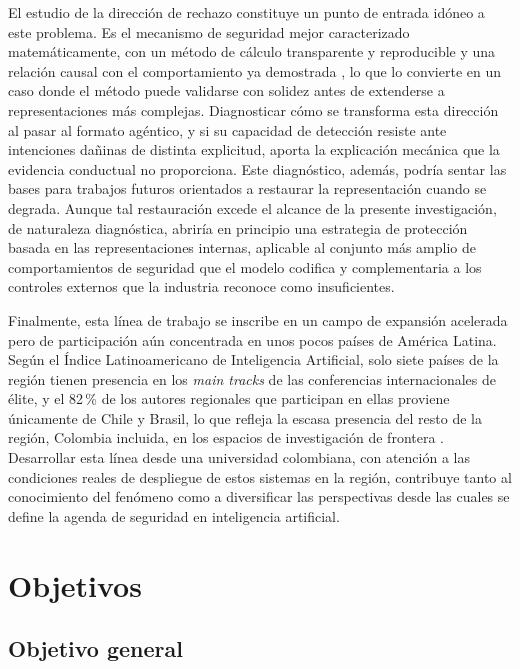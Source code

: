 \documentclass[12pt,a4paper]{article}
\newcommand{\parencite}[1]{\citep{#1}}
\begin{document}
El estudio de la dirección de rechazo constituye un punto de entrada idóneo a este problema. Es el mecanismo de seguridad mejor caracterizado matemáticamente, con un método de cálculo transparente y reproducible y una relación causal con el comportamiento ya demostrada \parencite{arditi2024}, lo que lo convierte en un caso donde el método puede validarse con solidez antes de extenderse a representaciones más complejas. Diagnosticar cómo se transforma esta dirección al pasar al formato agéntico, y si su capacidad de detección resiste ante intenciones dañinas de distinta explicitud, aporta la explicación mecánica que la evidencia conductual no proporciona. Este diagnóstico, además, podría sentar las bases para trabajos futuros orientados a restaurar la representación cuando se degrada. Aunque tal restauración excede el alcance de la presente investigación, de naturaleza diagnóstica, abriría en principio una estrategia de protección basada en las representaciones internas, aplicable al conjunto más amplio de comportamientos de seguridad que el modelo codifica y complementaria a los controles externos que la industria reconoce como insuficientes.

Finalmente, esta línea de trabajo se inscribe en un campo de expansión acelerada pero de participación aún concentrada en unos pocos países de América Latina. Según el Índice Latinoamericano de Inteligencia Artificial, solo siete países de la región tienen presencia en los \textit{main tracks} de las conferencias internacionales de élite, y el 82\,\% de los autores regionales que participan en ellas proviene únicamente de Chile y Brasil, lo que refleja la escasa presencia del resto de la región, Colombia incluida, en los espacios de investigación de frontera \parencite{ilia2025}. Desarrollar esta línea desde una universidad colombiana, con atención a las condiciones reales de despliegue de estos sistemas en la región, contribuye tanto al conocimiento del fenómeno como a diversificar las perspectivas desde las cuales se define la agenda de seguridad en inteligencia artificial.

\section{Objetivos}

\subsection{Objetivo general}
\end{document}
